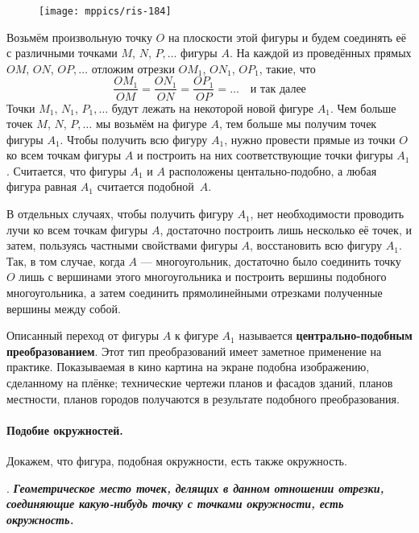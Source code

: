 \documentclass[oneside]{book}
\makeatletter
\newcommand{\rindex}[2][\imki@jobname]{%
  \index[#1]{\detokenize{#2}}%
}
\makeatother
\begin{document}
\begin{figure}[h]
\centering
\texttt{[image: mppics/ris-184]}
\caption{}\label{1938/ris-184}
\end{figure}

Возьмём произвольную точку $O$ на плоскости этой фигуры и будем соединять её с различными точками $M$, $N$, $P,\dots$
фигуры $A$.
На каждой из проведённых прямых $OM$, $ON$, $OP,\dots$
отложим отрезки $OM_1$, $ON_1$, $OP_1$, такие, что 
\[\frac{OM_1}{OM}=\frac{ON_1}{ON}=\frac{OP_1}{OP}=\dots\quad\text{и так далее}\]
Точки $M_1$, $N_1$, $P_1,\dots$ будут лежать на некоторой новой фигуре $A_1$.
Чем больше точек $M$, $N$, $P,\dots$
мы возьмём на фигуре $A$, тем больше мы получим точек фигуры $A_1$.
Чтобы получить всю фигуру $A_1$, нужно провести прямые из точки $O$ ко всем точкам фигуры $A$ и построить на них соответствующие точки фигуры $A_1$.
Считается, что фигуры $A_1$ и $A$ расположены центально-подобно,
а любая фигура равная $A_1$ считается подобной~$A$.

В отдельных случаях, чтобы получить фигуру $A_1$, нет необходимости проводить лучи ко всем точкам фигуры $A$, достаточно построить лишь несколько её точек, и затем, пользуясь частными свойствами фигуры $A$, восстановить всю фигуру $A_1$.
Так, в том случае, когда $A$ — многоугольник, достаточно было соединить точку $O$ лишь с вершинами этого многоугольника и построить вершины подобного многоугольника, а затем соединить прямолинейными отрезками полученные вершины между собой.

{\sloppy

Описанный переход от фигуры $A$ к фигуре $A_1$ называется \rindex{центрально-подобное преобразование}\textbf{центрально-подобным преобразованием}. 
Этот тип преобразований имеет заметное применение на практике.
Показываемая в кино картина на экране подобна изображению, сделанному на плёнке;
технические чертежи планов и фасадов зданий, планов местности, планов городов
получаются в результате подобного преобразования.

}

\paragraph{Подобие окружностей.}\label{1938/178}
Докажем, что фигура, подобная окружности, есть также окружность.


\smallskip
{}.
\textbf{\emph{Геометрическое место точек, делящих в данном отношении отрезки, соединяющие какую-нибудь точку с точками окружности, есть окружность.}}
\end{document}
